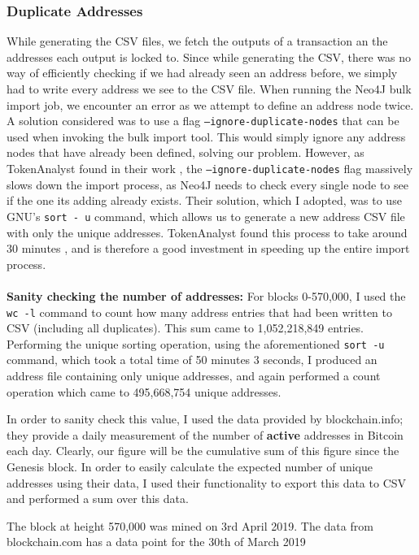 \subsubsection{Duplicate Addresses}
While generating the CSV files, we fetch the outputs of a transaction an the addresses each output is locked to. Since while generating the CSV, there was no way of efficiently checking if we had already seen an address before, we simply had to write every address we see to the CSV file. When running the Neo4J bulk import job, we encounter an error as we attempt to define an address node twice. A solution considered was to use a flag \texttt{--ignore-duplicate-nodes} that can be used when invoking the bulk import tool. This would simply ignore any address nodes that have already been defined, solving our problem. However, as TokenAnalyst found in their work \cite{RefWorks:doc:5c98e0cde4b044512c0b8641}, the \texttt{--ignore-duplicate-nodes} flag massively slows down the import process, as Neo4J needs to check every single node to see if the one its adding already exists. Their solution, which I adopted, was to use GNU's \texttt{sort - u} command, which allows us to generate a new address CSV file with only the unique addresses. TokenAnalyst found this process to take around 30 minutes \cite{RefWorks:doc:5c98e0cde4b044512c0b8641}, and is therefore a good investment in speeding up the entire import process. 
\\\\
\textbf{Sanity checking the number of addresses: } For blocks 0-570,000, I used the \texttt{wc -l} command to count how many address entries that had been written to CSV (including all duplicates). This sum came to 1,052,218,849 entries. Performing the unique sorting operation, using the aforementioned \texttt{sort -u} command, which took a total time of 50 minutes 3 seconds,  I produced an address file containing only unique addresses, and again performed a count operation which came to 495,668,754 unique addresses.

In order to sanity check this value, I used the data provided by blockchain.info; they provide a daily measurement of the number of \textbf{active} addresses in Bitcoin each day. Clearly, our figure will be the cumulative sum of this figure since the Genesis block. In order to easily calculate the expected number of unique addresses using their data, I used their functionality to export this data to CSV and performed a sum over this data. 

The block at height 570,000 was mined on 3rd April 2019. The data from blockchain.com has a data point for the 30th of March 2019 


